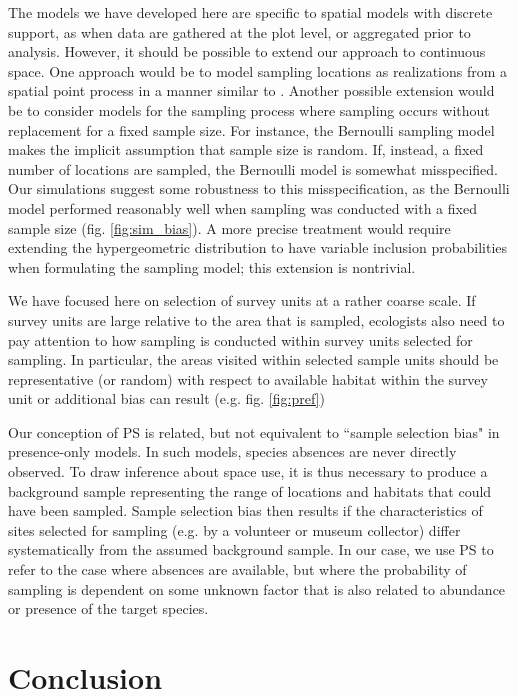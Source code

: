 \documentclass[times,mee,doublespace,]{besauth2}
\begin{document}
The models we have developed here are specific to spatial models with discrete support, as when data are gathered at the plot level, or aggregated prior to analysis.  However, it should be possible to extend our approach to continuous space.  One approach would be to model sampling locations as realizations from a spatial point process in a manner similar to \citet{WartonShepherd2010}. Another possible extension would be to consider models for the sampling process where sampling occurs without replacement for a fixed sample size.  For instance, the Bernoulli sampling model makes the implicit assumption that sample size is random.  If, instead, a fixed number of locations are sampled, the Bernoulli model is somewhat misspecified.  Our simulations suggest some robustness to this misspecification, as the Bernoulli model performed reasonably well when sampling was conducted with a fixed sample size (fig. \ref{fig:sim_bias}).  A more precise treatment would require extending the hypergeometric distribution to have variable inclusion probabilities when formulating the sampling model; this extension is nontrivial.

We have focused here on selection of survey units at a rather coarse scale.  If survey units are large relative to the area that is sampled, ecologists also need to pay attention to how sampling is conducted within survey units selected for sampling.  In particular, the areas visited within selected sample units should be representative (or random) with respect to available habitat within the survey unit or additional bias can result (e.g. fig. \ref{fig:pref})

Our conception of PS is related, but not equivalent to ``sample selection bias" \citep[e.g.][]{PhillipsEtAl2009} in presence-only models.  In such models, species absences are never directly observed.  To draw inference about space use, it is thus necessary to produce a background sample representing the range of locations and habitats that could have been sampled. Sample selection bias then results if the characteristics of sites selected for sampling (e.g. by a volunteer or museum collector) differ systematically from the assumed background sample.  In our case, we use PS to refer to the case where absences are available, but where the probability of sampling is dependent on some unknown factor that is also related to abundance or presence of the target species.

\section{Conclusion}
\end{document}
